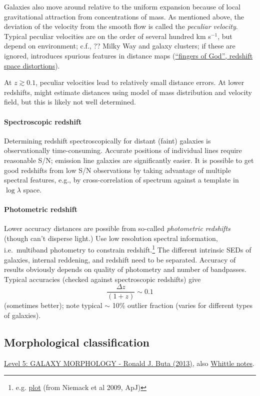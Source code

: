 \documentclass{article}
\newcommand{\mynotes}[1]{\textcolor{cadmiumgreen}{#1}}
\begin{document}
Galaxies also move around relative to the uniform expansion because of local
gravitational attraction from concentrations of mass.
As mentioned above, the deviation of the
velocity from the smooth flow is called the \textit{peculiar velocity}.
Typical peculiar velocities are on the order of several hundred km s$^{-1}$,
but depend on environment; c.f., \mynotes{??}
Milky Way and galaxy clusters; if these are ignored, introduces spurious
features in distance maps
(\href{http://astronomy.nmsu.edu/holtz/a555/resources/cfa.html}
{``fingers of God'', redshift space distortions}).

At $z \gtrsim 0.1$, peculiar velocities lead to relatively small distance
errors. At lower redshifts, might estimate distances using model of mass
distribution and velocity field, but this is likely not well determined.

\paragraph{Spectroscopic redshift}
Determining redshift spectroscopically for distant (faint) galaxies is
observationally time-consuming. Accurate positions of individual lines
require reasonable S/N; emission line galaxies are significantly easier.
It is possible to get good redshifts from low
S/N observations by taking advantage of multiple spectral features,
e.g., by cross-correlation of spectrum against a template
in $\log\lambda$ space.

\paragraph{Photometric redshift}
Lower accuracy distances are possible from so-called \textit{photometric
redshifts} \mynotes{(though can't disperse light.)}
Use low resolution spectral
information, i.e.\ multiband photometry to constrain redshift.\footnote{
    e.g. \href{http://astronomy.nmsu.edu/holtz/a555/resources/photoz.png}
    {plot} (from Niemack et al 2009, ApJ)}
The different intrinsic SEDs of galaxies, internal reddening, and
redshift need to be separated.
Accuracy of results obviously depends on quality of photometry
and number of bandpasses. Typical accuracies (checked against spectroscopic
redshifts) give
\[
    \frac{\Delta{z}}{\left(1+z\right)} \sim 0.1
    \]
(sometimes better); note typical $\sim$ 10\% outlier fraction
(varies for different types of galaxies).

\subsection{Morphological classification}
\href{https://ned.ipac.caltech.edu/level5/Sept11/Buta/frames.html}
{Level 5: GALAXY MORPHOLOGY - Ronald J. Buta (2013)}, also
\href{http://people.virginia.edu/~dmw8f/astr5630/Topic02/Lecture_2.html}
{Whittle notes}.
\end{document}
